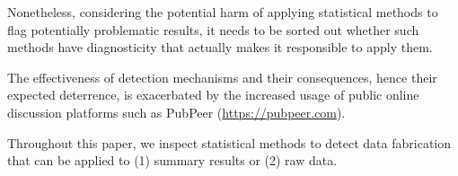 \documentclass{article}
\begin{document}
Nonetheless, considering the potential harm of applying statistical methods to flag potentially problematic results, it needs to be sorted out whether such methods have diagnosticity that actually makes it responsible to apply them. 

The effectiveness of detection mechanisms and their consequences, hence their expected deterrence, is exacerbated by the increased usage of public online discussion platforms such as PubPeer (\url{https://pubpeer.com}). 

Throughout this paper, we inspect statistical methods to detect data fabrication that can be applied to (1) summary results or (2) raw data. 
\end{document}
